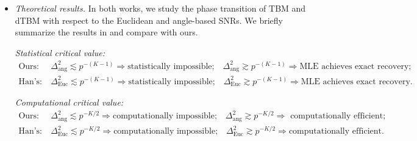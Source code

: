 \documentclass[lettersize,onecolumn,journal]{IEEEtran}
\theoremstyle{definition}
\theoremstyle{definition}
\newtheorem{example}{Example}
\begin{document}
{\begin{itemize}[wide]
\begin{example}[Comparison with Euclidean-based signal notion] \label{example:euc_alg} Consider a biclustering model with $\mtheta=1$ and an order-2 core matrix 
\begin{equation}
    \mS = \begin{pmatrix} p^{(\gamma+1)/2 } + 2  & 2 p^{(\gamma+1)/2} + 4\\
    2 & 4
    \end{pmatrix},\quad \text{with}\ \gamma \leq -1.
\end{equation}
The core matrix $\mS$ lies in the parameter spaces of TBM and our dTBM. Here, the constraint $\gamma \leq -1$ is added to ensure the bounded condition of $\mS$ in our parameter space in \eqref{eq:family}. The angle-based and Euclidean-based signal levels of $\mS$ are 
\begin{equation}
    \Delta_{\text{ang }}^2(\mS) = 0 \ \left(\leq p^{\gamma}\right), \quad \Delta_{\text{Euc}}^2(\mS) = 5 p^{\gamma + 1} \ \left(\geq p^{\gamma}\right).
\end{equation}
We conclude that TBM with $\mS$ achieves exact recovery with a polynomial-time algorithm; see \citet[Theorem 4]{han2020exact}. By contrast, the dTBM with the same $\mS$ and input $r=2$ violets the identifiability condition, and thus fails to be solved by all estimators; see our Theorem~\ref{thm:unique}. 
\end{example}
    
    \item \textit{Theoretical results.} In both works, we study the phase transition of TBM and dTBM with respect to the Euclidean and angle-based SNRs. We briefly summarize the results in \cite{han2020exact} and compare with ours. 
    
    \textit{Statistical critical value:}
    \begin{align}
        \text{Ours:}& \ \Delta_{\text{ang}}^2 \lesssim p^{-(K-1)} \Rightarrow \text{statistically impossible;} \quad \Delta_{\text{ang}}^2 \gtrsim   p^{-(K-1)} \Rightarrow \text{MLE achieves exact recovery;} \\
        \text{Han's:}& \ \Delta_{\text{Euc}}^2 \lesssim p^{-(K-1)} \Rightarrow \text{statistically impossible;} \quad \Delta_{\text{Euc}}^2 \gtrsim   p^{-(K-1)} \Rightarrow \text{MLE achieves exact recovery}.
    \end{align}
    
     \textit{Computational critical value:}
    \begin{align}
        \text{Ours:}& \ \Delta_{\text{ang}}^2 \lesssim p^{-K/2} \Rightarrow \text{computationally impossible;} \quad \Delta_{\text{ang}}^2 \gtrsim   p^{-K/2} \Rightarrow \text{ computationally efficient;} \\
        \text{Han's:}& \ \Delta_{\text{Euc}}^2 \lesssim p^{-K/2} \Rightarrow \text{computationally impossible;} \quad \Delta_{\text{Euc}}^2 \gtrsim   p^{-K/2} \Rightarrow \text{computationally efficient}.
    \end{align}
    

\end{itemize}}
\end{document}
